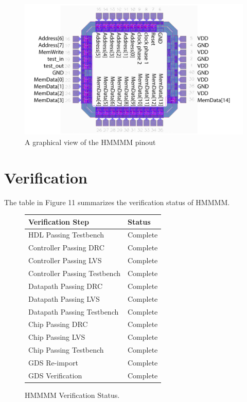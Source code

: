\documentclass[12pt]{article}
\begin{document}
\begin{figure}[H]
    \begin{center}
    \includegraphics[width=16cm]{pinoutgraphical.png}
    \caption{A graphical view of the HMMMM pinout}
    \end{center}
    \label{fig:pinoutgraphical}
\end{figure}

\section{Verification}

The table in Figure 11 summarizes the verification status of HMMMM.

\begin{figure}[H]
    \begin{center}
    \begin{tabular}{ll}
        Verification Step & Status \\
        \hline
        HDL Passing Testbench & Complete \\
        Controller Passing DRC & Complete \\
        Controller Passing LVS & Complete \\
        Controller Passing Testbench & Complete \\
        Datapath Passing DRC & Complete \\
        Datapath Passing LVS & Complete \\
        Datapath Passing Testbench & Complete \\
        Chip Passing DRC & Complete \\
        Chip Passing LVS & Complete \\
        Chip Passing Testbench & Complete \\
        GDS Re-import & Complete \\
        GDS Verification & Complete
    \end{tabular}
    \caption{HMMMM Verification Status.}
    \end{center}
    \label{fig:verificationstatus}
\end{figure}
\end{document}
